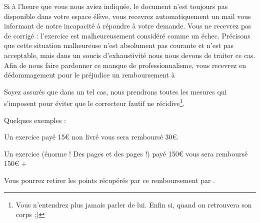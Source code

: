 ﻿Si à l’heure que vous nous aviez indiquée, le document n’est toujours pas disponible dans votre espace élève, vous recevrez automatiquement un mail vous informant de notre incapacité à répondre à votre demande. Vous ne recevrez \b{pas} de corrigé : l’exercice est malheureusement considéré comme un échec. Précisons que cette situation malheureuse n’est absolument pas courante et n’est pas acceptable, mais dans un soucis d’exhaustivité nous nous devons de traiter ce cas.
Afin de nous faire pardonner ce manque de professionnalisme, vous recevrez en dédommagement pour le préjudice un remboursement à %

Soyez assurés que dans un tel cas, nous prendrons toutes les mesures qui s’imposent pour éviter que le correcteur fautif ne récidive\footnote{Vous n’entendrez plus jamais parler de lui. Enfin si, quand on retrouvera son corps ;)}.

Quelques exemples :
\item Un exercice payé 15€ non livré vous sera remboursé 30€.
\item Un exercice (énorme ! Des pages et des pages !) payé 150€ vous sera remboursé 150€ + %

Vous pourrez retirer les points récupérés par ce remboursement par .